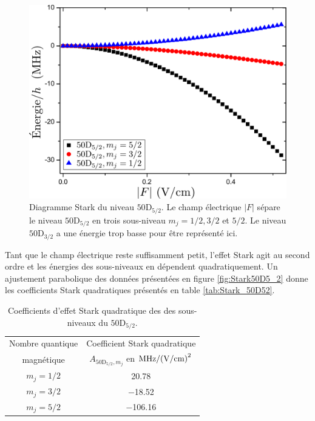 \begin{figure}[h]
\centering
\includegraphics[width=0.7\linewidth]{figures/circulars/Stark50D5_2}
\caption[Diagramme Stark du niveau $\mathrm{50D_{5/2}}$]{
Diagramme Stark du niveau $\mathrm{50D_{5/2}}$.
Le champ électrique $|F|$ sépare le niveau $\mathrm{50D_{5/2}}$ en trois sous-niveau $m_j=1/2,3/2$ et $5/2$.
Le niveau $\mathrm{50D_{3/2}}$ a une énergie trop basse pour être représenté ici.
}
\label{fig:Stark50D5_2}
\end{figure}

Tant que le champ électrique reste suffisamment petit, l'effet Stark agit au second ordre et les énergies des sous-niveaux en dépendent quadratiquement.
Un ajustement parabolique des données présentées en figure \eqref{fig:Stark50D5_2} donne les coefficients Stark quadratiques présentés en table \eqref{tab:Stark_50D52}.

\begin{table}[h]
	\centering
	\caption[Effet Stark quadratique des sous-niveaux du $\mathrm{50D}_{5/2}$]{Coefficients d'effet Stark quadratique des des sous-niveaux du $\mathrm{50D}_{5/2}$.
	}
	\label{tab:Stark_50D52}
	\begin{tabular}{c c }
		\toprule\midrule
		Nombre quantique
		& Coefficient Stark quadratique
		\\
		magnétique
		& $A_{\mathrm{50D}_{5/2},m_j}$ en $\si{\MHz \per (\V \per\cm) \squared}$ \\
		\midrule
		$m_j=1/2$
		& \SI[retain-explicit-plus]{+20.78}{} \\
		$m_j=3/2$
		& \SI{-18.52}{} \\
		$m_j=5/2$
		& \SI{-106.16}{} \\
		\midrule
		\bottomrule
 	\end{tabular}
\end{table}

